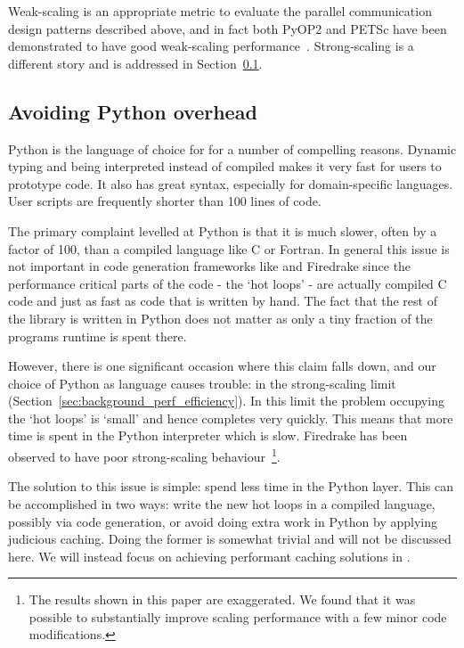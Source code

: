 Weak-scaling is an appropriate metric to evaluate the parallel communication design patterns described above, and in fact both PyOP2 and PETSc have been demonstrated to have good weak-scaling performance~\cite{rathgeberFiredrakeAutomatingFinite2016}. %
Strong-scaling is a different story and is addressed in Section~\ref{sec:impl_overhead}.

\subsection{Avoiding Python overhead}
\label{sec:impl_overhead}

Python is the language of choice for  for a number of compelling reasons.
Dynamic typing and being interpreted instead of compiled makes it very fast for users to prototype code.
It also has great syntax, especially for domain-specific languages.
User scripts are frequently shorter than 100 lines of code.

The primary complaint levelled at Python is that it is much slower, often by a factor of 100, than a compiled language like C or Fortran.
In general this issue is not important in code generation frameworks like  and Firedrake since the performance critical parts of the code - the `hot loops' - are actually compiled C code and just as fast as code that is written by hand.
The fact that the rest of the library is written in Python does not matter as only a tiny fraction of the programs runtime is spent there.

However, there is one significant occasion where this claim falls down, and our choice of Python as language causes trouble: in the strong-scaling limit (Section~\ref{sec:background_perf_efficiency}).
In this limit the problem occupying the `hot loops' is `small' and hence completes very quickly.
This means that more time is spent in the Python interpreter which is slow.
Firedrake has been observed to have poor strong-scaling behaviour~\cite{changComparativeStudyFinite2018}\footnote{The results shown in this paper are exaggerated. We found that it was possible to substantially improve scaling performance with a few minor code modifications.}.

The solution to this issue is simple: spend less time in the Python layer.
This can be accomplished in two ways: write the new hot loops in a compiled language, possibly via code generation, or avoid doing extra work in Python by applying judicious caching.
Doing the former is somewhat trivial and will not be discussed here.
We will instead focus on achieving performant caching solutions in .

